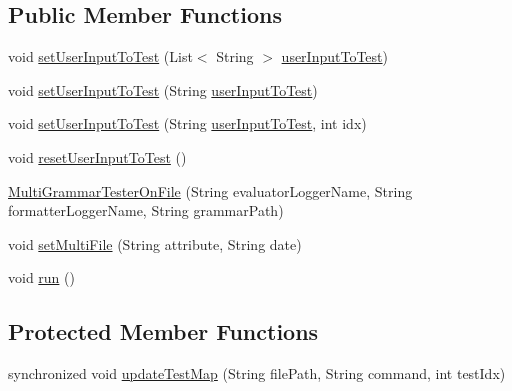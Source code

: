 \subsection*{Public Member Functions}
\begin{DoxyCompactItemize}
\item 
void \hyperlink{classit_1_1emarolab_1_1cagg_1_1interfaces_1_1CaggMultiGrammarTesterOnFile_1_1MultiGrammarTesterOnFile_ae4fa7699741c6b3df79f0f7aebb53c9e}{set\-User\-Input\-To\-Test} (List$<$ String $>$ \hyperlink{classit_1_1emarolab_1_1cagg_1_1interfaces_1_1CaggMultiGrammarTesterOnFile_1_1MultiGrammarTesterOnFile_a93d89bd3fd1b8f94fa8b3ef7b5dccd09}{user\-Input\-To\-Test})
\item 
void \hyperlink{classit_1_1emarolab_1_1cagg_1_1interfaces_1_1CaggMultiGrammarTesterOnFile_1_1MultiGrammarTesterOnFile_a6e2c0a1a467b4e3cd88d5d77aa955861}{set\-User\-Input\-To\-Test} (String \hyperlink{classit_1_1emarolab_1_1cagg_1_1interfaces_1_1CaggMultiGrammarTesterOnFile_1_1MultiGrammarTesterOnFile_a93d89bd3fd1b8f94fa8b3ef7b5dccd09}{user\-Input\-To\-Test})
\item 
void \hyperlink{classit_1_1emarolab_1_1cagg_1_1interfaces_1_1CaggMultiGrammarTesterOnFile_1_1MultiGrammarTesterOnFile_a39e74786d81118c5eeca4cf13fbd2af1}{set\-User\-Input\-To\-Test} (String \hyperlink{classit_1_1emarolab_1_1cagg_1_1interfaces_1_1CaggMultiGrammarTesterOnFile_1_1MultiGrammarTesterOnFile_a93d89bd3fd1b8f94fa8b3ef7b5dccd09}{user\-Input\-To\-Test}, int idx)
\item 
void \hyperlink{classit_1_1emarolab_1_1cagg_1_1interfaces_1_1CaggMultiGrammarTesterOnFile_1_1MultiGrammarTesterOnFile_a6ba03809ef84cfe47a6a8274a6f6ee0d}{reset\-User\-Input\-To\-Test} ()
\item 
\hyperlink{classit_1_1emarolab_1_1cagg_1_1interfaces_1_1CaggMultiGrammarTesterOnFile_1_1MultiGrammarTesterOnFile_a5dc3959f967271bbef233e1d73b7c76a}{Multi\-Grammar\-Tester\-On\-File} (String evaluator\-Logger\-Name, String formatter\-Logger\-Name, String grammar\-Path)
\item 
void \hyperlink{classit_1_1emarolab_1_1cagg_1_1interfaces_1_1CaggMultiGrammarTesterOnFile_1_1MultiGrammarTesterOnFile_aba430af69f5eb1cff9ce6fbfe2544012}{set\-Multi\-File} (String attribute, String date)
\item 
void \hyperlink{classit_1_1emarolab_1_1cagg_1_1interfaces_1_1CaggMultiGrammarTesterOnFile_1_1MultiGrammarTesterOnFile_ab50d829da5916b341406fa21ded16d85}{run} ()
\end{DoxyCompactItemize}
\subsection*{Protected Member Functions}
\begin{DoxyCompactItemize}
\item 
synchronized void \hyperlink{classit_1_1emarolab_1_1cagg_1_1interfaces_1_1CaggMultiGrammarTesterOnFile_1_1MultiGrammarTesterOnFile_a04f725bc8b43b86201a124cfb4748979}{update\-Test\-Map} (String file\-Path, String command, int test\-Idx)
\end{DoxyCompactItemize}
